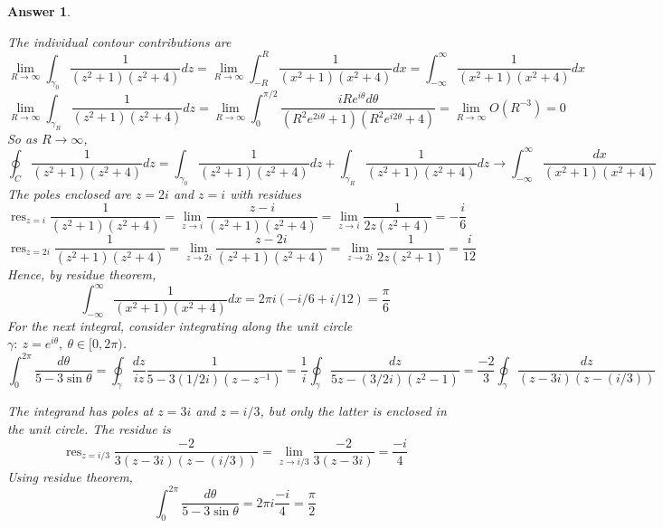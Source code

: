 \documentclass[a4paper]{article}
\DeclareMathOperator{\res}{res}
\newtheorem{ans}{Answer}[section]
\theoremstyle{new}
\begin{document}
\begin{ans}
\begin{enumerate}[label=(\alph*)]
\begin{center}
  \end{center}
The individual contour contributions are
$$\lim_{R\rightarrow\infty}\int_{\gamma_0}\frac{1}{(z^2+1)(z^2+4)}dz=\lim_{R\rightarrow\infty}\int_{-R}^R\frac{1}{(x^2+1)(x^2+4)}dx=\int_{-\infty}^\infty\frac{1}{(x^2+1)(x^2+4)}dx$$
$$\lim_{R\rightarrow\infty}\int_{\gamma_R}\frac{1}{(z^2+1)(z^2+4)}dz=\lim_{R\rightarrow\infty}\int_0^{\pi/2}\frac{iRe^{i\theta}d\theta}{(R^2e^{2i\theta}+1)(R^2e^{i2\theta}+4)}=\lim_{R\rightarrow\infty}O(R^{-3})=0$$
So as $R\rightarrow\infty$,
$$\oint_C\frac{1}{(z^2+1)(z^2+4)}dz=\int_{\gamma_0}\frac{1}{(z^2+1)(z^2+4)}dz+\int_{\gamma_R}\frac{1}{(z^2+1)(z^2+4)}dz\rightarrow\int_{-\infty}^\infty\frac{dx}{(x^2+1)(x^2+4)}$$
The poles enclosed are $z=2i$ and $z=i$ with residues
$$\res_{z=i}\frac{1}{(z^2+1)(z^2+4)}=\lim_{z\rightarrow i}\frac{z-i}{(z^2+1)(z^2+4)}=\lim_{z\rightarrow i}\frac{1}{2z(z^2+4)}=-\frac{i}{6}$$
$$\res_{z=2i}\frac{1}{(z^2+1)(z^2+4)}=\lim_{z\rightarrow 2i}\frac{z-2i}{(z^2+1)(z^2+4)}=\lim_{z\rightarrow 2i}\frac{1}{2z(z^2+1)}=\frac{i}{12}$$
Hence, by residue theorem,
$$\int_{-\infty}^\infty \frac{1}{(x^2+1)(x^2+4)}dx=2\pi i(-i/6+i/12)=\frac{\pi}{6}$$
For the next integral, consider integrating along the unit circle $\gamma:~z=e^{i\theta},~\theta\in[0,2\pi)$. 
$$\int_0^{2\pi}\frac{d\theta}{5-3\sin\theta}=\oint_\gamma\frac{dz}{iz}\frac{1}{5-3(1/2i)(z-z^{-1})}=\frac{1}{i}\oint_\gamma\frac{dz}{5z-(3/2i)(z^2-1)}=\frac{-2}{3}\oint_\gamma\frac{dz}{(z-3i)(z-(i/3))}$$
 \begin{center}
  \end{center}
  The integrand has poles at $z=3i$ and $z=i/3$, but only the latter is enclosed in the unit circle. The residue is
  $$\res_{z=i/3}\frac{-2}{3(z-3i)(z-(i/3))}=\lim_{z\rightarrow i/3}\frac{-2}{3(z-3i)}=\frac{-i}{4}$$
  Using residue theorem,
  $$\int_0^{2\pi}\frac{d\theta}{5-3\sin\theta}=2\pi i\frac{-i}{4}=\frac{\pi}{2}$$
\end{enumerate}
\end{ans}
\end{document}
